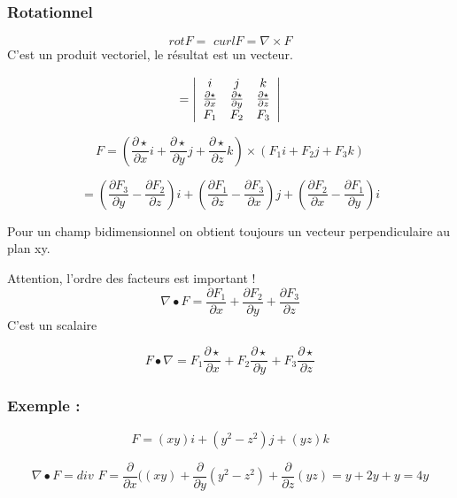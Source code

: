 \subsubsection{Rotationnel}
\begin{mydef}
\[\textit{rot}F = \textit{ curl}F = \nabla \times F\]
C'est un produit vectoriel, le résultat est un vecteur.

\[=
\left|
\begin{array}{c c c}
i&j&k\\
\frac{\partial \star}{\partial x} & \frac{\partial \star}{\partial y} &\frac{\partial \star}{\partial z} \\
F_1& F_2&F_3
\end{array}
\right|
\]


\[\textit{F} = \left( \frac{\partial \star}{\partial x} i +\frac{\partial \star}{\partial y} j +\frac{\partial \star}{\partial z} k \right) \times  (F_1 i +F_2 j +F_3 k) \]

\[=\left( \frac{\partial F_3}{\partial y } -  \frac{\partial F_2}{\partial z }\right) i
+\left( \frac{\partial F_1}{\partial z } -  \frac{\partial F_3}{\partial x }\right) j
+\left( \frac{\partial F_2}{\partial x } -  \frac{\partial F_1}{\partial y }\right) i
\]

Pour un champ bidimensionnel on obtient toujours un vecteur perpendiculaire au plan xy.
\end{mydef}




\begin{myrem}

Attention, l'ordre des facteurs est important !
\[\nabla \bullet F = \frac{\partial F_1}{\partial x}+ \frac{\partial F_2 }{\partial y}+ \frac{\partial F_3 }{\partial z}\] C'est un scalaire

\[F\bullet \nabla = F_1  \frac{\partial \star }{\partial x}+F_2 \frac{\partial \star }{\partial y}+ F_3  \frac{\partial \star }{\partial z}\]

 \end{myrem}

\subsubsection{Exemple :}

\[F=(xy)i+(y^2-z^2)j+(yz)k\]

\[\nabla \bullet F = \textit{div } F = \frac{\partial }{\partial x} ( (xy)+\frac{\partial }{\partial y} (y^2-z^2)+\frac{\partial }{\partial z} (yz) = y+2y+y=4y\]

